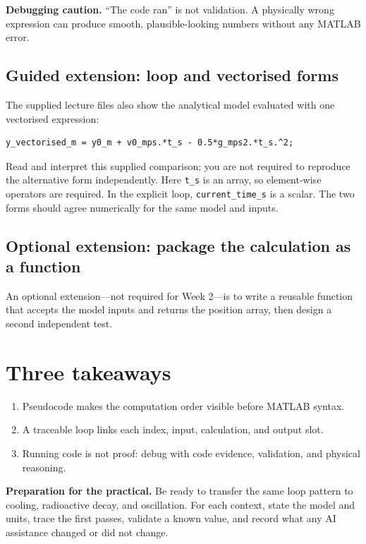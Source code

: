 \documentclass[11pt,a4paper]{article}
\begin{document}
\begin{aibox}\textbf{Debugging caution.} ``The code ran'' is not validation. A physically wrong expression can produce smooth, plausible-looking numbers without any MATLAB error.\end{aibox}

\subsection*{Guided extension: loop and vectorised forms}
The supplied lecture files also show the analytical model evaluated with one vectorised expression:
\begin{lstlisting}[style=matlabstyle,caption={Supplied vectorised evaluation of the same position model}]
y_vectorised_m = y0_m + v0_mps.*t_s - 0.5*g_mps2.*t_s.^2;
\end{lstlisting}
Read and interpret this supplied comparison; you are not required to reproduce the alternative form independently. Here \texttt{t\_s} is an array, so element-wise operators are required. In the explicit loop, \texttt{current\_time\_s} is a scalar. The two forms should agree numerically for the same model and inputs.

\subsection*{Optional extension: package the calculation as a function}
An optional extension---not required for Week 2---is to write a reusable function that accepts the model inputs and returns the position array, then design a second independent test.

\section*{Three takeaways}
\begin{enumerate}[nosep,leftmargin=6mm]
\item Pseudocode makes the computation order visible before MATLAB syntax.
\item A traceable loop links each index, input, calculation, and output slot.
\item Running code is not proof: debug with code evidence, validation, and physical reasoning.
\end{enumerate}

\begin{keybox}\textbf{Preparation for the practical.} Be ready to transfer the same loop pattern to cooling, radioactive decay, and oscillation. For each context, state the model and units, trace the first passes, validate a known value, and record what any AI assistance changed or did not change.\end{keybox}
\end{document}

